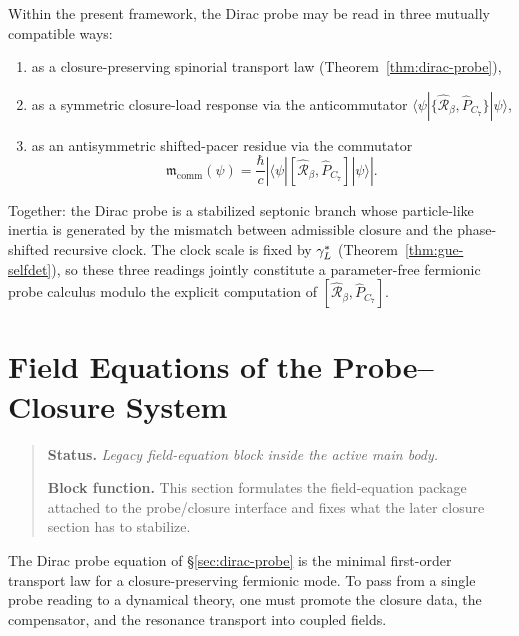 \begin{proposition}
\label{prop:three-compatible-readings}
Within the present framework, the Dirac probe may be read in three
mutually compatible ways:
\begin{enumerate}[label=(\roman*)]
  \item as a closure-preserving spinorial transport law
        (Theorem~\ref{thm:dirac-probe}),
  \item as a symmetric closure-load response via the anticommutator
        $\langle\psi|\{\hat{\mathcal{R}}_\beta,\hat P_{C_7}\}|\psi\rangle$,
  \item as an antisymmetric shifted-pacer residue via the commutator
        \[
          \mathfrak{m}_{\mathrm{comm}}(\psi)
          = \frac{\hbar}{c}
            \left|\langle\psi|
            [\hat{\mathcal{R}}_\beta,\hat P_{C_7}]|\psi\rangle
            \right|.
        \]
\end{enumerate}
Together: the Dirac probe is a stabilized septonic branch whose
particle-like inertia is generated by the mismatch between admissible
closure and the phase-shifted recursive clock.
The clock scale is fixed by $\gamma_L^*$ (Theorem~\ref{thm:gue-selfdet}),
so these three readings jointly constitute a parameter-free fermionic
probe calculus modulo the explicit computation of
$[\hat{\mathcal{R}}_\beta,\hat P_{C_7}]$.
\end{proposition}



\section{Field Equations of the Probe--Closure System}
\begin{quote}\small
\noindent\textbf{Status.} \emph{Legacy field-equation block inside the active main body.}\par
\noindent\textbf{Block function.} This section formulates the field-equation package attached to the probe/closure interface and fixes what the later closure section has to stabilize.
\end{quote}
\label{sec:field-eq}

\begin{remark}
The Dirac probe equation of \S\ref{sec:dirac-probe} is the minimal
first-order transport law for a closure-preserving fermionic mode.
To pass from a single probe reading to a dynamical theory, one must
promote the closure data, the compensator, and the resonance transport
into coupled fields.
\end{remark}


